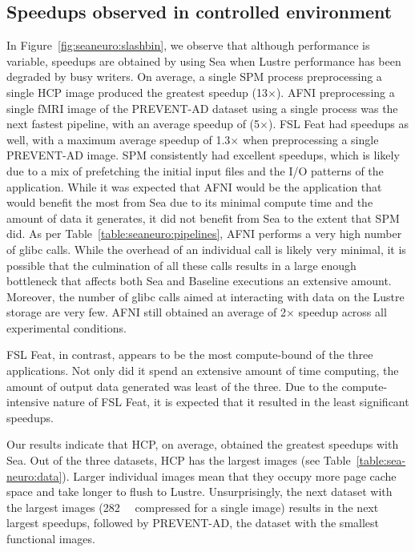 \subsection{Speedups observed in controlled environment}


In Figure~\ref{fig:seaneuro:slashbin}, we observe that although performance is
variable, speedups are obtained by using Sea when Lustre
performance has been degraded by busy writers. On average, a single SPM
process preprocessing a single HCP image produced the greatest speedup
(13$\times$). AFNI preprocessing a single fMRI image of the PREVENT-AD dataset
using a single process was the next fastest pipeline, with an average speedup of
(5$\times$). FSL Feat had speedups as well, with a maximum average speedup of
1.3$\times$ when preprocessing a single PREVENT-AD image. SPM consistently had
excellent speedups, which is likely due to a mix of prefetching the initial
input files and the I/O patterns of the application. While it was expected that
AFNI would be the application that would benefit the most from Sea due to its
minimal compute time and the amount of data it generates, it did not benefit
from Sea to the extent that SPM did. As per Table~\ref{table:seaneuro:pipelines},
AFNI performs a very high number of glibc calls. While the overhead of an
individual call is likely very minimal, it is possible that the culmination of
all these calls results in a large enough bottleneck that affects both Sea and
Baseline executions an extensive amount. Moreover, the number of glibc calls
aimed at interacting with data on the Lustre storage are very few. AFNI still
obtained an average of 2$\times$ speedup across all experimental conditions.

FSL Feat, in contrast, appears to be the most compute-bound of the three
applications. Not only did it spend an extensive amount of time computing, the
amount of output data generated was least of the three. Due to the
compute-intensive nature of FSL Feat, it is expected that it resulted in the
least significant speedups.

Our results indicate that HCP, on average, obtained the greatest speedups with
Sea. Out of the three datasets, HCP has the largest images (see
Table~\ref{table:sea-neuro:data}). Larger individual images mean that they
occupy more page cache space and take longer to flush to Lustre. Unsurprisingly,
the next dataset with the largest images (\SI{282}{\mebi\byte} compressed for a
single image) results in the next largest speedups, followed by PREVENT-AD, the
dataset with the smallest functional images.

